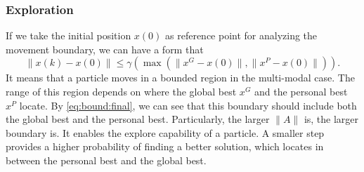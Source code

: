 \subsubsection{Exploration}

If we take the initial position $ x(0) $ as reference point for analyzing the movement boundary, we can have a form that 
\begin{equation}
\lVert x(k) - x(0) \rVert \leq \gamma ( \max ( \lVert x^{G} - x(0) \rVert , \lVert x^{P} - x(0) \rVert ) ).
\end{equation}
It means that a particle moves in a bounded region in the multi-modal case.
The range of this region depends on where the global best $ x^{G} $ and the personal best $ x^{P} $ locate.
By \eqref{eq:bound:final}, we can see that this boundary should include both the global best and the personal best.
Particularly, the larger $ \lVert A \rVert $ is, the larger boundary is.
It enables the explore capability of a particle.
A smaller step provides a higher probability of finding a better solution, which locates in between the personal best and the global best.

